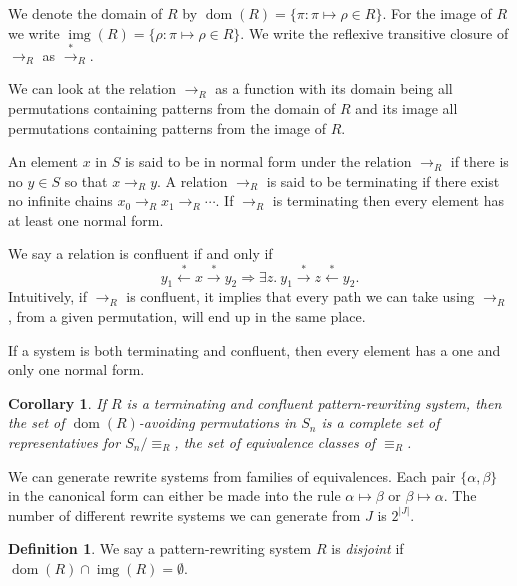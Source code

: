 \documentclass[a4paper, 11pt, english]{article}
\newcommand{\patternrule}{ \mapsto \!}
\newtheorem{corollary}[theorem]{Corollary}
\theoremstyle{definition}
\newtheorem{definition}[theorem]{Definition}
\newcommand{\Sym}{S}
\newcommand{\from}{\leftarrow}
\newcommand{\tostar}{\stackrel{*}{\to}}
\newcommand{\fromstar}{\stackrel{*}{\from}}
\DeclareMathOperator{\dom}{dom}
\DeclareMathOperator{\img}{img}
\begin{document}
We denote the domain of $R$ by $\dom(R) = \{\pi : \pi \patternrule
\rho \in R\}$. For the image of $R$ we write $\img(R) = \{\rho : \pi
\patternrule \rho \in R\}$. We write the reflexive transitive closure of
$\to_R$ as $\tostar_R$. 

We can look at the relation $\to_R$ as a function with its domain being all permutations containing
patterns from the domain of $R$ and its image all permutations containing patterns from the image of
$R$.

An element $x$ in $\Sym$ is said to be in normal form under the relation $\to_R$
if there is no $y \in \Sym$ so that $x \to_R y$. A relation $\to_R$ is said to be
terminating if there exist no infinite chains $x_0 \to_R x_1 \to_R \cdots$. If
$\to_R$ is terminating then every element has at least one normal form. 

We say a relation is confluent if and only if
$$
    y_1 \fromstar x \tostar y_2 \Longrightarrow 
    \exists z. \  y_1 \tostar z \fromstar y_2.
$$
Intuitively, if $\to_R$ is confluent, it implies that every path we can
take using $\to_R$, from a given permutation, will end up in the same place. 

If a system is both terminating and confluent, then every element has a one and
only one normal form.

\begin{corollary}
    If $R$ is a terminating and confluent pattern-rewriting system, then the set
    of $\dom(R)$-avoiding permutations in $S_n$ is a complete set of
    representatives for $S_n / \equiv_R$, the set of equivalence classes of
    $\equiv_R$.
\end{corollary}

We can generate rewrite systems from families of equivalences. Each pair $\{\alpha, \beta \}$ in the
canonical form can either be made into the rule $\alpha \patternrule \beta$ or $\beta \patternrule
\alpha$. The number of different rewrite systems we can generate from $J$ is $2^{|J|}$.

\begin{definition}
  We say a pattern-rewriting system $R$ is \emph{disjoint} if $\dom(R) \cap \img(R) = \emptyset$.
\end{definition}
\end{document}
